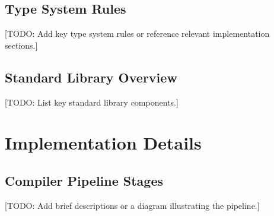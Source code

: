 \subsection{Type System Rules} %
[TODO: Add key type system rules or reference relevant implementation sections.]

\subsection{Standard Library Overview} %
[TODO: List key standard library components.]

\section{Implementation Details} %

\subsection{Compiler Pipeline Stages} %
[TODO: Add brief descriptions or a diagram illustrating the pipeline.]

